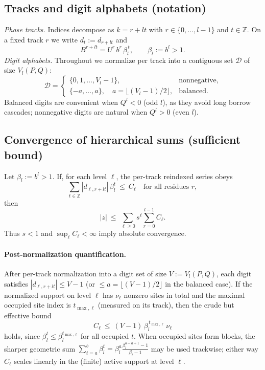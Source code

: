 \documentclass[11pt]{article}
\theoremstyle{definition}
\theoremstyle{remark}
\newcommand{\Z}{\mathbb{Z}}
\begin{document}
\subsection*{Tracks and digit alphabets (notation)}
\emph{Phase tracks.} Indices decompose as $k=r+lt$ with $r\in\{0,\dots,l-1\}$ and $t\in\mathbb Z$.
On a fixed track $r$ we write $d_t:=d_{r+lt}$ and
\[
B^{r+lt} = U^r\,b^{r}\,\beta_l^{\,t},\qquad \beta_l:=b^l>1.
\]
\emph{Digit alphabets.} Throughout we normalize per track into a contiguous set $\mathcal D$ of size $V_l(P,Q)$:
\[
\mathcal D=
\begin{cases}
\{0,1,\dots,V_l-1\}, & \text{nonnegative},\\[2pt]
\{-a,\dots,a\},\quad a=\big\lfloor (V_l-1)/2\big\rfloor, & \text{balanced}.
\end{cases}
\]
Balanced digits are convenient when $Q^l<0$ (odd $l$), as they avoid long borrow cascades; nonnegative digits are natural when $Q^l>0$ (even $l$).

\subsection*{Convergence of hierarchical sums (sufficient bound)}
Let $\beta_l:=b^l>1$. If, for each level $\ell$, the per-track reindexed series obeys
\[
\sum_{t\in\Z}\! |d_{\ell,r+lt}|\,\beta_l^{t}\ \le\ C_\ell\quad\text{for all residues }r,
\]
then
\[
|z|\ \le\ \sum_{\ell\ge0} s^\ell \sum_{r=0}^{l-1} C_\ell.
\]
Thus $s<1$ and $\sup_\ell C_\ell<\infty$ imply absolute convergence.

\paragraph{Post-normalization quantification.}
After per-track normalization into a digit set of size $V:=V_l(P,Q)$, each digit satisfies $|d_{\ell,r+lt}|\le V-1$ (or $\le a=\lfloor(V-1)/2\rfloor$ in the balanced case). If the normalized support on level $\ell$ has $\nu_\ell$ nonzero sites in total and the maximal occupied site index is $t_{\max,\ell}$ (measured on its track), then the crude but effective bound
\[
\boxed{\ C_\ell\ \le\ (V-1)\,\beta_l^{\,t_{\max,\ell}}\,\nu_\ell\ }
\]
holds, since $\beta_l^{t}\le \beta_l^{t_{\max,\ell}}$ for all occupied $t$. When occupied sites form blocks, the sharper geometric sum
$\sum_{t=a}^{b}\beta_l^t=\beta_l^{a}\frac{\beta_l^{b-a+1}-1}{\beta_l-1}$
may be used trackwise; either way $C_\ell$ scales linearly in the (finite) active support at level $\ell$.
\end{document}
